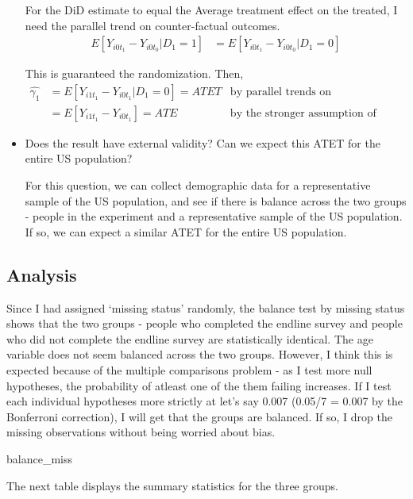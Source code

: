 \documentclass[11pt]{article}
\begin{document}
\begin{itemize}
   
		For the DiD estimate to equal the Average treatment effect on the treated, I need the parallel trend on counter-factual outcomes. 		
		\begin{align*}
			E[Y_{i0t_1} - Y_{i0t_0} | D_1 = 1]  &= E[Y_{i0t_1} - Y_{i0t_0} | D_1 = 0]
		\end{align*} 
		
		This is guaranteed the randomization. Then, 
		\begin{align*}
			\hat{\gamma_1} &= E[Y_{i1t_1} - Y_{i0t_1} | D_1 = 0] = ATET &\text{by parallel trends on counterfactual outcomes} \\
			&= E[Y_{i1t_1} - Y_{i0t_1}] = ATE &\text{by the stronger assumption of randomization}
		\end{align*}		
		
		
		\item 
		
		Does the result have external validity? Can we expect this ATET for the entire US population?
		
		For this question, we can collect demographic data for a representative sample of the US population, and see if there is balance across the two groups - people in the experiment and a representative sample of the US population. If so, we can expect a similar ATET for the entire US population.
		
	\end{itemize}
	\pagebreak

	\subsection*{Analysis}
	
	
	Since I had assigned `missing status' randomly, the balance test by missing status shows that the two groups - people who completed the endline survey and people who did not complete the endline survey are statistically identical. The age variable does not seem balanced across the two groups. However, I think this is expected because of the multiple comparisons problem - as I test more null hypotheses, the probability of atleast one of the them failing increases. If I test each individual hypotheses more strictly at let's say 0.007 (0.05/7 = 0.007 by the Bonferroni correction), I will get that the groups are balanced. If so, I drop the missing observations without being worried about bias. 
	
	{balance_miss}
	
	The next table displays the summary statistics for the three groups. 
	
\end{document}
